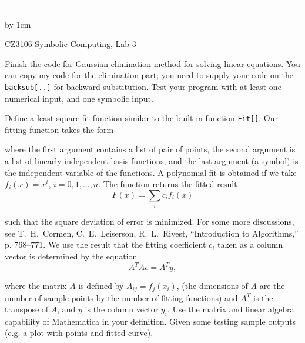 \magnification=\magstephalf

\advance\vsize by 1cm
\nopagenumbers

\centerline{\titlefont CZ3106 Symbolic Computing, Lab 3}
\bigskip
{}
\problem Finish the code for Gaussian elimination method for solving
linear equations.  You can copy my code for the elimination part; 
you need to supply your code on the {\tt backsub[..]} for backward 
substitution.  Test your program with at least one numerical input, and
one symbolic input. 

\problem Define a least-square fit function similar to the built-in
function {\tt Fit[]}.  Our fitting function takes the form\par
{}
\item{} where the first argument contains a list of pair of points,
the second argument is a list of linearly independent basis 
functions, and the last argument (a symbol) is the independent variable of the functions. 
A polynomial fit is obtained if we take $f_i(x) = x^i$, $i = 0, 1, \ldots, n$.
The function returns the fitted result
$$F(x) = \sum_i c_i f_i(x)$$
\item{} such that the square deviation of error is minimized.  For some more
discussions, see T.~H.~Cormen, C.~E.~Leiserson, R.~L.~Rivest, ``Introduction
to Algorithms,'' p. 768--771.  We use the result
that the fitting coefficient $c_i$ taken as a column vector
is determined by the equation
$$ A^{T}A c = A^{T} y, $$
\item{} where the matrix $A$ is defined by $A_{ij} = f_j(x_i)$, 
(the dimensions of $A$ are the number of sample points by the number of 
fitting functions) and $A^{T}$ is the
transpose of $A$, and $y$ is the column vector $y_i$.   Use the matrix
and linear algebra capability of Mathematica in your definition.
Given some testing sample outputs (e.g. a plot with points and fitted curve).

